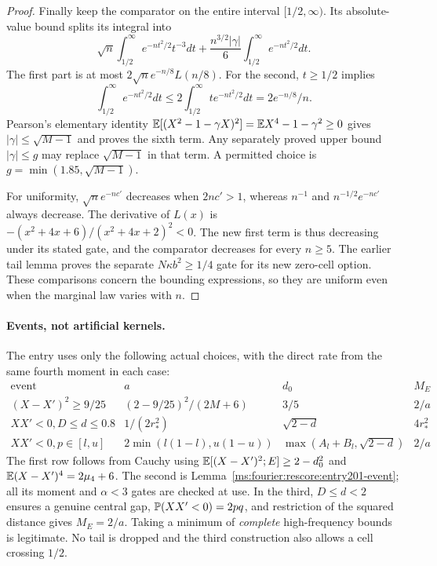 \begin{proof}
Finally keep the comparator on the entire interval $[1/2,\infty)$.
Its absolute-value bound splits its integral into
\[
 \sqrt n\int_{1/2}^{\infty}e^{-nt^2/2}t^{-3}dt
 +\frac{n^{3/2}|\gamma|}{6}
                 \int_{1/2}^{\infty}e^{-nt^2/2}dt.
\]
The first part is at most $2\sqrt n e^{-n/8}L(n/8)$.
For the second, $t\ge1/2$ implies
\[
 \int_{1/2}^{\infty}e^{-nt^2/2}dt
 \le2\int_{1/2}^{\infty}t e^{-nt^2/2}dt
 =2e^{-n/8}/n.
\]
Pearson's elementary identity
$\mathbb E[(X^2-1-\gamma X)^2]=\mathbb E X^4-1-\gamma^2\ge0$
gives $|\gamma|\le\sqrt{M-1}$ and proves the sixth term.
Any separately proved upper bound $|\gamma|\le g$ may replace
$\sqrt{M-1}$ in that term. A permitted choice is
$g=\min(1.85,\sqrt{M-1})$.

For uniformity, $\sqrt n e^{-nc'}$ decreases when $2nc'>1$,
whereas $n^{-1}$ and $n^{-1/2}e^{-nc'}$ always decrease.
The derivative of $L(x)$ is
$-(x^2+4x+6)/(x^2+4x+2)^2<0$.
The new first term is thus decreasing under its stated gate, and the
comparator decreases for every $n\ge5$. The earlier tail lemma proves
the separate $N\kappa b^2\ge1/4$ gate for its new zero-cell option.
These comparisons concern the bounding expressions, so they are uniform
even when the marginal law varies with $n$.
\end{proof}\paragraph{Events, not artificial kernels.}\label{ms:fourier:rescore:fourier-events}
The entry uses only the following actual choices, with the direct rate
from the same fourth moment in each case:
\[
\begin{array}{c|c|c|c}
 \text{event}&a&d_0&M_E\\\hline
 (X-X')^2\ge9/25 &(2-9/25)^2/(2M+6)&3/5&2/a\\
 XX'<0, D\le d\le0.8 &1/(2r_*^2)&\sqrt{2-d}&4r_*^2\\
 XX'<0, p\in[l,u] &2\min(l(1-l),u(1-u))
 &\max(A_l+B_l,\sqrt{2-d})&2/a
\end{array}
\]
The first row follows from Cauchy using
$\mathbb E[(X-X')^2;E]\ge2-d_0^2$ and
$\mathbb E(X-X')^4=2\mu_4+6$. The second is Lemma~\ref{ms:fourier:rescore:entry201-event}; all its moment and $\alpha<3$ gates are checked at use.
In the third, $D\le d<2$ ensures a genuine central gap,
$\mathbb P(XX'<0)=2pq$, and restriction of the squared distance gives $M_E=2/a$.
Taking a minimum of \emph{complete} high-frequency bounds is legitimate. No tail is
dropped and the third construction also allows a cell crossing $1/2$.


